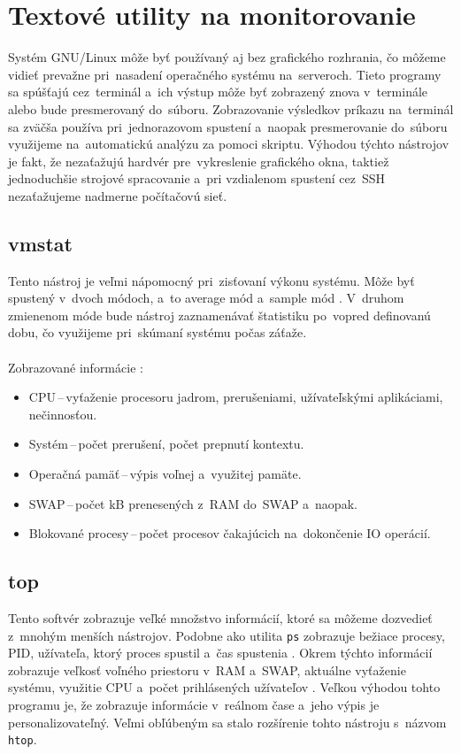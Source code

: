 \section{Textové utility na monitorovanie}
Systém GNU/Linux môže byť používaný aj bez grafického rozhrania, čo môžeme vidieť prevažne pri~nasadení operačného systému na~serveroch. Tieto programy sa spúšťajú cez~terminál a~ich výstup môže byť zobrazený znova v~terminále alebo bude presmerovaný do~súboru. Zobrazovanie výsledkov príkazu na~terminál sa zväčša používa pri~jednorazovom spustení a~naopak presmerovanie do~súboru využijeme na~automatickú analýzu za pomoci skriptu. Výhodou týchto nástrojov je fakt, že nezaťažujú hardvér pre~vykreslenie grafického okna, taktiež jednoduchšie strojové spracovanie a~pri vzdialenom spustení cez~SSH nezaťažujeme nadmerne počítačovú sieť.  

\subsection*{vmstat}
Tento nástroj je veľmi nápomocný pri~zisťovaní výkonu systému. Môže byť spustený v~dvoch módoch, a~to average mód a~sample mód \cite{text-utils-book}. V~druhom zmienenom móde bude nástroj zaznamenávať štatistiku po~vopred definovanú dobu, čo využijeme pri~skúmaní systému počas záťaže.
\\\\
\noindent
Zobrazované informácie \cite{text-utils-book}:
\begin{itemize}
	\item CPU\,--\,vyťaženie procesoru jadrom, prerušeniami, užívateľskými aplikáciami, nečinnosťou.
	\item Systém\,--\,počet prerušení, počet prepnutí kontextu.
	\item Operačná pamäť\,--\,výpis voľnej a~využitej pamäte.
	\item SWAP\,--\,počet kB prenesených z~RAM do~SWAP a~naopak.
	\item Blokované procesy\,--\,počet procesov čakajúcich na~dokončenie IO operácií.\\
\end{itemize}

\subsection*{top}
Tento softvér zobrazuje veľké množstvo informácií, ktoré sa môžeme dozvedieť z~mnohým menších nástrojov. Podobne ako utilita \texttt{ps} zobrazuje bežiace procesy, PID, užívateľa, ktorý proces spustil a~čas spustenia \cite{performance-monitor-book}. Okrem týchto informácií zobrazuje veľkosť voľného priestoru v~RAM a~SWAP, aktuálne vyťaženie systému, využitie CPU a~počet prihlásených užívateľov \cite{performance-monitor-book}. Veľkou výhodou tohto programu je, že zobrazuje informácie v~reálnom čase a~jeho výpis je personalizovateľný. Veľmi obľúbeným sa stalo rozšírenie tohto nástroju s~názvom \texttt{htop}.

